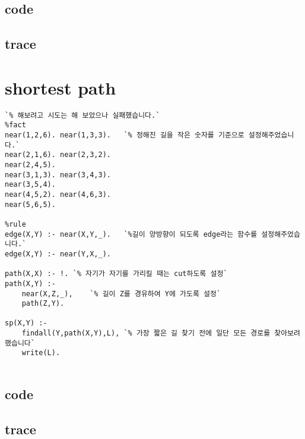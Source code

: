 \documentclass{article}
\begin{document}
\subsection{code}
\subsection{trace}

\section{shortest path}
\begin{lstlisting}[escapeinside=``]
`% 해보려고 시도는 해 보았으나 실패했습니다.`
%fact
near(1,2,6). near(1,3,3).   `% 정해진 길을 작은 숫자를 기준으로 설정해주었습니다.`
near(2,1,6). near(2,3,2). 
near(2,4,5).
near(3,1,3). near(3,4,3).
near(3,5,4).
near(4,5,2). near(4,6,3).
near(5,6,5).

%rule
edge(X,Y) :- near(X,Y,_).   `%길이 양방향이 되도록 edge라는 함수를 설정해주었습니다.`
edge(X,Y) :- near(Y,X,_).

path(X,X) :- !. `% 자기가 자기를 가리킬 때는 cut하도록 설정`
path(X,Y) :- 
	near(X,Z,_),    `% 길이 Z를 경유하여 Y에 가도록 설정`
	path(Z,Y).
	
sp(X,Y) :- 
	findall(Y,path(X,Y),L), `% 가장 짧은 길 찾기 전에 일단 모든 경로를 찾아보려했습니다`
	write(L).
	
\end{lstlisting}
\subsection{code}
\subsection{trace}
\end{document}
